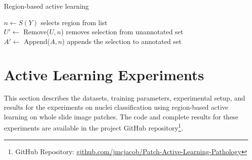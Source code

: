 \begin{algorithm}[h]
	\caption{Region-based active learning}
	\label{alg:regionbased}
	{
		$n \gets S(Y)$ \hfill selects region from list\\
		$U' \gets$ Remove($U, n$) \hfill removes selection from unannotated set\\
		$A' \gets$ Append($A, n$) \hfill appends the selection to annotated set\\
	}
\end{algorithm}



\section{Active Learning Experiments}
\label{sec:active_experiments}
This section describes the datasets, training parameters, experimental setup, and results for the experiments on nuclei classification using region-based active learning on whole slide image patches. The code and complete results for these experiments are available in the project GitHub repository\footnote{GitHub Repository: \url{github.com/jmcjacob/Patch-Active-Learning-Pathology}}.

